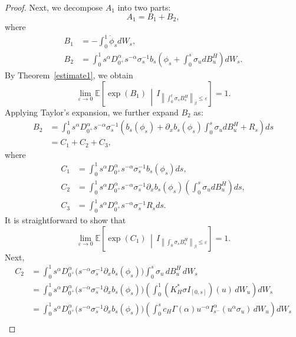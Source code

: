 \documentclass[preprint,12pt]{elsarticle}
\theoremstyle{definition}  %
\theoremstyle{plain}  %
\begin{document}
\begin{proof}
Next, we decompose $A_1$ into two parts:
\begin{equation*}
	A_1 = B_1 + B_2,
\end{equation*}
where
\begin{align*}
	B_1 &= -\int_0^1 \dot{\phi}_s  dW_s, \\
	B_2 &= \int_0^1 s^{\alpha} D_{0^+}^\alpha s^{-\alpha} \sigma_s^{-1} b_s \left( \phi_s + \int_0^s \sigma_u  dB^H_u \right) dW_s.
\end{align*}
By Theorem~\ref{estimate1}, we obtain
\begin{equation*}
	\lim_{\varepsilon \to 0} \mathbb{E} \left[ \exp(B_1) \,\middle|\, I_{\left\| \int_0^t \sigma_s B^H_s \right\|_\beta \leq \varepsilon} \right] = 1.
\end{equation*}
Applying Taylor's expansion, we further expand $B_2$ as:
\begin{align*}
	B_2 &= \int_0^1 s^{\alpha} D_{0^+}^\alpha s^{-\alpha} \sigma_s^{-1} \left( b_s(\phi_s) + \partial_x b_s(\phi_s) \int_0^s \sigma_u  dB^H_u + R_s \right) ds \\
	    &= C_1 + C_2 + C_3,
\end{align*}
where
\begin{align*}
    C_1 &= \int_0^1 s^{\alpha} D_{0^+}^\alpha s^{-\alpha} \sigma_s^{-1} b_s(\phi_s)  ds, \\
    C_2 &= \int_0^1 s^{\alpha} D_{0^+}^\alpha s^{-\alpha} \sigma_s^{-1} \partial_x b_s(\phi_s) \left( \int_0^s \sigma_u  dB^H_u \right) ds,\\
    C_3 &= \int_0^1 s^{\alpha} D_{0^+}^\alpha s^{-\alpha} \sigma_s^{-1} R_s  ds.
\end{align*}
It is straightforward to show that
\begin{equation*}
	\lim_{\varepsilon \to 0} \mathbb{E} \left[ \exp(C_1) \,\middle|\, I_{\left\| \int_0^\cdot \sigma_s B^H_s \right\|_\beta \leq \varepsilon} \right] = 1.
\end{equation*}
Next, 
\begin{align*}
	C_2
	&=\int_0^1 s^{\alpha}D_{0^+}^\alpha \big(s^{-\alpha} \sigma_s^{-1}\partial_x b_s(\phi_s)\big)\int_0^s \sigma_u\, dB^H_u \, dW_s   \\ %
	&=  \int_0^1 s^{\alpha}D_{0^+}^\alpha \big(s^{-\alpha} \sigma_s^{-1}\partial_x b_s(\phi_s)\big)\left(\int_0^1 (K_H^*\sigma I_{[0,s]})(u)\, dW_u\right) dW_s \\ %
	&=\int_0^1 s^{\alpha}D_{0^+}^\alpha \big(s^{-\alpha} \sigma_s^{-1}\partial_x b_s(\phi_s)\big)\left(\int_0^s c_H\Gamma(\alpha)u^{-\alpha}I_{s^-}^\alpha (u^\alpha  \sigma_u)\, dW_u \right)dW_s \\ %

\end{align*}
\end{proof}
\end{document}
